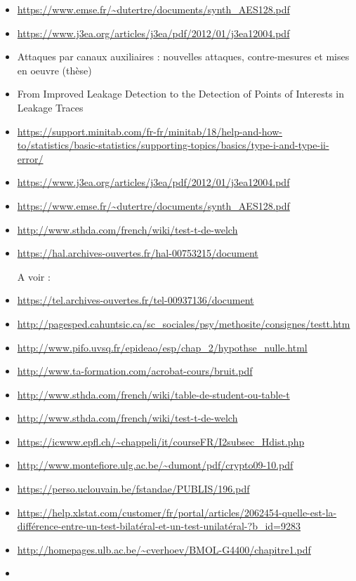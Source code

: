 \documentclass[10pt, oneside, a4paper]{article}
\begin{document}
\begin{itemize}
\item \url{https://www.emse.fr/~dutertre/documents/synth_AES128.pdf}
\item \url{https://www.j3ea.org/articles/j3ea/pdf/2012/01/j3ea12004.pdf}
\item Attaques par canaux auxiliaires : nouvelles attaques, contre-mesures et mises en oeuvre (thèse)
\item From Improved Leakage Detection to the Detection of Points of Interests in Leakage Traces
\item \url{https://support.minitab.com/fr-fr/minitab/18/help-and-how-to/statistics/basic-statistics/supporting-topics/basics/type-i-and-type-ii-error/}
\item \url{https://www.j3ea.org/articles/j3ea/pdf/2012/01/j3ea12004.pdf}
\item \url{https://www.emse.fr/~dutertre/documents/synth_AES128.pdf}
\item \url{http://www.sthda.com/french/wiki/test-t-de-welch}
\item \url{https://hal.archives-ouvertes.fr/hal-00753215/document}

A voir :
\item \url{https://tel.archives-ouvertes.fr/tel-00937136/document}
\item \url{http://pagesped.cahuntsic.ca/sc_sociales/psy/methosite/consignes/testt.htm}
\item \url{http://www.pifo.uvsq.fr/epideao/esp/chap_2/hypothse_nulle.html}
\item \url{http://www.ta-formation.com/acrobat-cours/bruit.pdf}
\item \url{http://www.sthda.com/french/wiki/table-de-student-ou-table-t}
\item \url{http://www.sthda.com/french/wiki/test-t-de-welch}
\item \url{https://icwww.epfl.ch/~chappeli/it/courseFR/I2subsec_Hdist.php}
\item \url{http://www.montefiore.ulg.ac.be/~dumont/pdf/crypto09-10.pdf}
\item \url{https://perso.uclouvain.be/fstandae/PUBLIS/196.pdf}
\item \url{https://help.xlstat.com/customer/fr/portal/articles/2062454-quelle-est-la-différence-entre-un-test-bilatéral-et-un-test-unilatéral-?b_id=9283}
\item \url{http://homepages.ulb.ac.be/~cverhoev/BMOL-G4400/chapitre1.pdf}
\item \url{}
\end{itemize}
\end{document}
